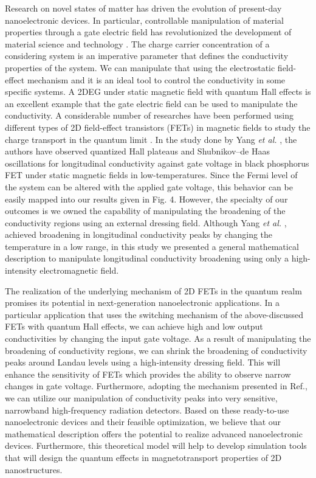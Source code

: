 \documentclass{article}
\begin{document}
\begin{itemize}
{  Research on novel states of matter has driven the evolution of present-day nanoelectronic devices. In particular, controllable manipulation of material properties through a gate electric field has revolutionized the development of material science and technology \cite{ahn03,deng18}.
  The charge carrier concentration of a considering system is an imperative parameter that defines the conductivity properties of the system. We can manipulate that using the electrostatic field-effect mechanism and it is an ideal tool to control the conductivity in some specific systems.
  A 2DEG under static magnetic field with quantum Hall effects is an excellent example that the gate electric field can be used to manipulate the conductivity. A considerable number of researches have been performed using different types of 2D field-effect transistors (FETs) in magnetic fields to study the charge transport in the quantum limit \cite{wakabayashi78,yang18,long20,li14}. In the study done by Yang \textit{et al.} \cite{yang18}, the authors have observed quantized Hall plateaus and Shubnikov–de Haas oscillations for longitudinal conductivity against gate voltage in black phosphorus FET under static magnetic fields in low-temperatures. Since the Fermi level of the system can be altered with the applied gate voltage, this behavior can be easily mapped into our results given in Fig. 4. However, the specialty of our outcomes is we owned the capability of manipulating the broadening of the conductivity regions using an external dressing field. Although Yang \textit{et al.} \cite{yang18}, achieved broadening in longitudinal conductivity peaks by changing the temperature in a low range, in this study we presented a general mathematical description to manipulate longitudinal conductivity broadening using only a high-intensity electromagnetic field.

  The realization of the underlying mechanism of 2D FETs in the quantum realm promises its potential in next-generation nanoelectronic applications. In a particular application that uses the switching mechanism of the above-discussed FETs with quantum Hall effects, we can achieve high and low output conductivities by changing the input gate voltage. As a result of manipulating the broadening of conductivity regions, we can shrink the broadening of conductivity peaks around Landau levels using a high-intensity dressing field. This will enhance the sensitivity of FETs which provides the ability to observe narrow changes in gate voltage.
  Furthermore, adopting the mechanism presented in Ref.\cite{hirakawa01}, we can utilize our manipulation of conductivity peaks into very sensitive, narrowband high-frequency radiation detectors.
  Based on these ready-to-use nanoelectronic devices and their feasible optimization, we believe that our mathematical description offers the potential to realize advanced nanoelectronic devices. Furthermore, this theoretical model will help to develop simulation tools that will design the quantum effects in magnetotransport properties of 2D nanostructures.
  }
\end{itemize}
\end{document}
